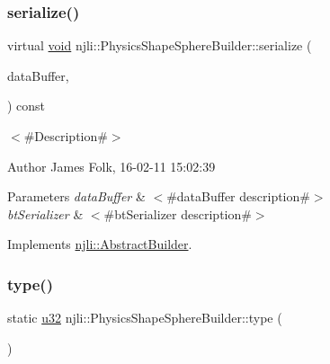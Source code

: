 \subsubsection{\texorpdfstring{serialize()}{serialize()}}
{\footnotesize\ttfamily virtual \mbox{\hyperlink{_thread_8h_af1e856da2e658414cb2456cb6f7ebc66}{void}} njli\+::\+Physics\+Shape\+Sphere\+Builder\+::serialize (\begin{DoxyParamCaption}\item[{\mbox{\hyperlink{_thread_8h_af1e856da2e658414cb2456cb6f7ebc66}{void}} $\ast$}]{data\+Buffer,  }\item[{bt\+Serializer $\ast$}]{ }\end{DoxyParamCaption}) const\hspace{0.3cm}{\ttfamily [virtual]}}



$<$\#\+Description\#$>$ 

\begin{DoxyAuthor}{Author}
James Folk, 16-\/02-\/11 15\+:02\+:39
\end{DoxyAuthor}

\begin{DoxyParams}{Parameters}
{\em data\+Buffer} & $<$\#data\+Buffer description\#$>$ \\
\hline
{\em bt\+Serializer} & $<$\#bt\+Serializer description\#$>$ \\
\hline
\end{DoxyParams}


Implements \mbox{\hyperlink{classnjli_1_1_abstract_builder_ab66b774e02ccb9da554c9aab7fa6d981}{njli\+::\+Abstract\+Builder}}.

\mbox{\label{classnjli_1_1_physics_shape_sphere_builder_a87f9f44f646b362c3ba46fcacad3a4d8}} 
\subsubsection{\texorpdfstring{type()}{type()}}
{\footnotesize\ttfamily static \mbox{\hyperlink{_util_8h_a10e94b422ef0c20dcdec20d31a1f5049}{u32}} njli\+::\+Physics\+Shape\+Sphere\+Builder\+::type (\begin{DoxyParamCaption}{ }\end{DoxyParamCaption})\hspace{0.3cm}{\ttfamily [static]}}

